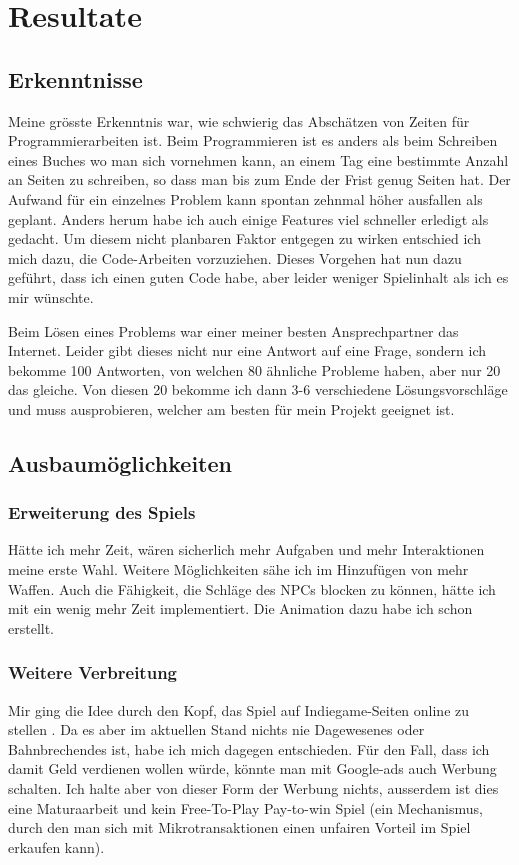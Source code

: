 \chapter{Resultate}

\section{Erkenntnisse}
Meine grösste Erkenntnis war, wie schwierig das Abschätzen von Zeiten für Programmierarbeiten ist. Beim Programmieren ist es anders als beim Schreiben eines Buches wo man sich vornehmen kann, an einem Tag eine bestimmte Anzahl an Seiten zu schreiben, so dass man bis zum Ende der Frist genug Seiten hat.
Der Aufwand für ein einzelnes Problem kann spontan zehnmal höher ausfallen als geplant. Anders herum habe ich auch einige Features viel schneller erledigt als gedacht.
Um diesem nicht planbaren Faktor entgegen zu wirken entschied ich mich dazu, die Code-Arbeiten vorzuziehen.
Dieses Vorgehen hat nun dazu geführt, dass ich einen guten Code habe, aber leider weniger Spielinhalt als ich es mir wünschte.

Beim Lösen eines Problems war einer meiner besten Ansprechpartner das Internet.
Leider gibt dieses nicht nur eine Antwort auf eine Frage, sondern ich bekomme 100 Antworten, von welchen 80 ähnliche Probleme haben, aber nur 20 das gleiche.
Von diesen 20 bekomme ich dann 3-6 verschiedene Lösungsvorschläge und muss ausprobieren, welcher am besten für mein Projekt geeignet ist.

\section{Ausbaumöglichkeiten}

\subsection{Erweiterung des Spiels}
Hätte ich mehr Zeit, wären sicherlich mehr Aufgaben und mehr Interaktionen meine erste Wahl. Weitere Möglichkeiten sähe ich im Hinzufügen von mehr Waffen. Auch die Fähigkeit, die Schläge des NPCs blocken zu können, hätte ich mit ein wenig mehr Zeit implementiert. Die Animation dazu habe ich schon erstellt.

\subsection{Weitere Verbreitung}

Mir ging die Idee durch den Kopf, das Spiel auf Indiegame-Seiten online zu stellen .
Da es aber im aktuellen Stand nichts nie Dagewesenes oder Bahnbrechendes ist, habe ich mich dagegen entschieden.
Für den Fall, dass ich damit Geld verdienen wollen würde, könnte man mit Google-ads auch Werbung schalten.
Ich halte aber von dieser Form der Werbung nichts, ausserdem ist dies eine Maturaarbeit und kein Free-To-Play Pay-to-win Spiel
(ein Mechanismus, durch den man sich mit Mikrotransaktionen einen unfairen Vorteil im Spiel erkaufen kann).

